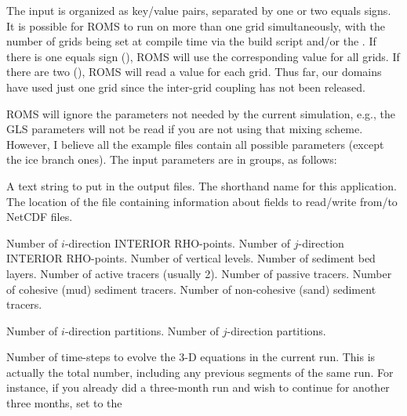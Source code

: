 The input is organized as key/value pairs, separated by one or two
equals signs. It is possible for ROMS to run on more than one grid
simultaneously, with the number of grids being set at compile time
via the build script and/or the . If there is one
equals sign (\code{=}), ROMS will use the corresponding value for
all grids. If there are two (\code{==}), ROMS will read a value for
each grid. Thus far, our domains have used just one grid since the
inter-grid coupling has not been released.

ROMS will ignore the parameters not needed by the current
simulation, e.g., the GLS parameters will not be read if you are not
using that mixing scheme. However, I believe all the example files
contain all possible parameters (except the ice branch ones).
The input parameters are in groups, as follows:
\begin{klist}
    \mbox{}
     \begin{klist}
    A text string to put in the output files.
    The shorthand name for this application.
    The location of the  file
     containing information about fields to read/write from/to NetCDF
     files.
     \end{klist}
    \mbox{}
     \begin{klist}
        Number of $i$-direction INTERIOR RHO-points.
        Number of $j$-direction INTERIOR RHO-points.
        Number of vertical levels.
        Number of sediment bed layers.
        Number of active tracers (usually 2).
        Number of passive tracers.
        Number of cohesive (mud) sediment tracers.
        Number of non-cohesive (sand) sediment tracers.
     \end{klist}
    \mbox{}
     \begin{klist}
        Number of $i$-direction partitions.
        Number of $j$-direction partitions.
     \end{klist}
    \mbox{}
     \begin{klist}
           Number of time-steps to evolve the 3-D
       equations in the current run.  This is actually the total
     number, including any previous segments of the same run.  For
     instance, if you already did a three-month run and wish to
     continue for another three months, set  to the

\end{klist}
\end{klist}
